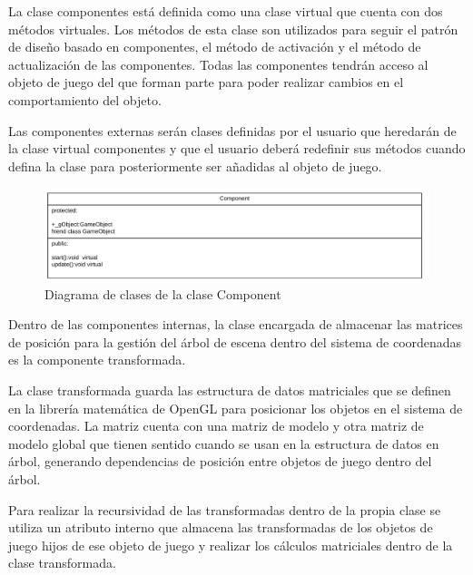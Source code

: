 \documentclass[a4paper, 17pt]{book}
\begin{document}
La clase componentes está definida como una clase virtual que cuenta con dos métodos virtuales. Los métodos de esta clase son utilizados
para seguir el patrón de diseño basado en componentes, el método de activación y el método de actualización de las componentes. Todas
las componentes tendrán acceso al objeto de juego del que forman parte para poder realizar cambios en el comportamiento del objeto.

\vspace{1mm} %

Las componentes externas serán clases definidas por el usuario que heredarán de la clase virtual componentes y que el usuario deberá
redefinir sus métodos cuando defina la clase para posteriormente ser añadidas al objeto de juego.

\begin{figure}[H]
    \centering
    \includegraphics[scale=0.3, keepaspectratio]{img/Component.png}
    \caption{Diagrama de clases de la clase Component}
    \label{figura:Component}
\end{figure}

Dentro de las componentes internas, la clase encargada de almacenar las matrices de posición para la gestión del árbol de escena dentro
del sistema de coordenadas es la componente transformada.

\vspace{1mm} %

La clase transformada guarda las estructura de datos matriciales que se definen en la librería matemática de OpenGL para posicionar los
objetos en el sistema de coordenadas. La matriz cuenta con una matriz de modelo y otra matriz de modelo global que tienen sentido cuando
se usan en la estructura de datos en árbol, generando dependencias de posición entre objetos de juego dentro del árbol.

\vspace{1mm} %

Para realizar la recursividad de las transformadas dentro de la propia clase se utiliza un atributo interno que almacena las transformadas
de los objetos de juego hijos de ese objeto de juego y realizar los cálculos matriciales dentro de la clase transformada.
\end{document}
